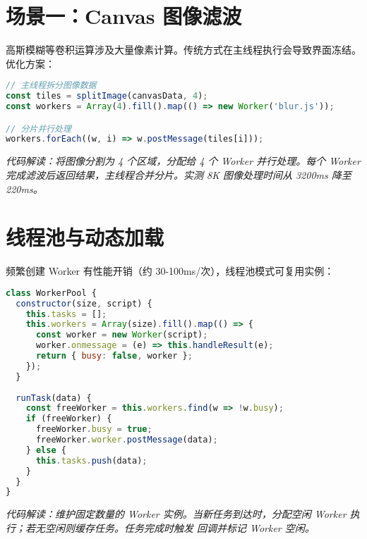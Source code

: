 \section{场景一：Canvas 图像滤波}
高斯模糊等卷积运算涉及大量像素计算。传统方式在主线程执行会导致界面冻结。优化方案：\par
\begin{lstlisting}[language=javascript]
// 主线程拆分图像数据
const tiles = splitImage(canvasData, 4); 
const workers = Array(4).fill().map(() => new Worker('blur.js'));

// 分片并行处理
workers.forEach((w, i) => w.postMessage(tiles[i])); 
\end{lstlisting}
\textit{代码解读：将图像分割为 4 个区域，分配给 4 个 Worker 并行处理。每个 Worker 完成滤波后返回结果，主线程合并分片。实测 8K 图像处理时间从 3200ms 降至 220ms。}\par
\section{线程池与动态加载}
频繁创建 Worker 有性能开销（约 30-100ms/次），线程池模式可复用实例：\par
\begin{lstlisting}[language=javascript]
class WorkerPool {
  constructor(size, script) {
    this.tasks = [];
    this.workers = Array(size).fill().map(() => {
      const worker = new Worker(script);
      worker.onmessage = (e) => this.handleResult(e);
      return { busy: false, worker };
    });
  }
  
  runTask(data) {
    const freeWorker = this.workers.find(w => !w.busy);
    if (freeWorker) {
      freeWorker.busy = true;
      freeWorker.worker.postMessage(data);
    } else {
      this.tasks.push(data);
    }
  }
}
\end{lstlisting}
\textit{代码解读：维护固定数量的 Worker 实例。当新任务到达时，分配空闲 Worker 执行；若无空闲则缓存任务。任务完成时触发  回调并标记 Worker 空闲。}\par
